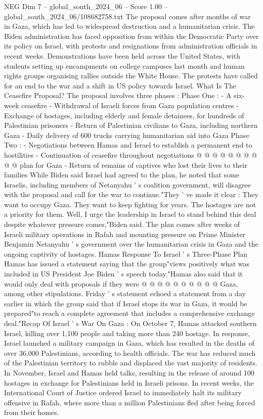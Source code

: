 \begin{textsample}{NEG Dim 7 – global\_south\_2024\_06 – Score 1.00 – global\_south\_2024\_06/108682758.txt}  \label{ex:f7_neg_217}
The proposal comes after months of war in Gaza, which has led to widespread destruction and a humanitarian crisis.
The Biden administration has faced opposition from within the Democratic Party over its policy on Israel, with protests and resignations from administration officials in recent weeks.
Demonstrations have been held across the United States, with students setting up encampments on college campuses last month and human rights groups organising rallies outside the White House.
The protests have called for an end to the war and a shift in US policy towards Israel.
What Is The Ceasefire Proposal?
The proposal involves three phases : Phase One : - A six-week ceasefire - Withdrawal of Israeli forces from Gaza population centres - Exchange of hostages, including elderly and female detainees, for hundreds of Palestinian prisoners - Return of Palestinian civilians to Gaza, including northern Gaza - Daily delivery of 600 trucks carrying humanitarian aid into Gaza Phase Two : - Negotiations between Hamas and Israel to establish a permanent end to hostilities - Continuation of ceasefire throughout negotiations @ @ @ @ @ @ @ @ @ @ plan for Gaza - Return of remains of captives who lost their lives to their families While Biden said Israel had agreed to the plan, he noted that some Israelis, including members of Netanyahu ' s coalition government, will disagree with the proposal and call for the war to continue."They ' ve made it clear : They want to occupy Gaza.
They want to keep fighting for years.
The hostages are not a priority for them.
Well, I urge the leadership in Israel to stand behind this deal despite whatever pressure comes,"Biden said.
The plan comes after weeks of Israeli military operations in Rafah and mounting pressure on Prime Minister Benjamin Netanyahu ' s government over the humanitarian crisis in Gaza and the ongoing captivity of hostages.
Hamas Response To Israel ' s Three-Phase Plan Hamas has issued a statement saying that the group"views positively what was included in US President Joe Biden ' s speech today."Hamas also said that it would only deal with proposals if they were @ @ @ @ @ @ @ @ @ @ Gaza, among other stipulations.
Friday ' s statement echoed a statement from a day earlier in which the group said that if Israel stops its war in Gaza, it would be prepared"to reach a complete agreement that includes a comprehensive exchange deal."Recap Of Israel ' s War On Gaza : On October 7, Hamas attacked southern Israel, killing over 1,100 people and taking more than 240 hostage.
In response, Israel launched a military campaign in Gaza, which has resulted in the deaths of over 36,000 Palestinians, according to health officials.
The war has reduced much of the Palestinian territory to rubble and displaced the vast majority of residents.
In November, Israel and Hamas held talks, resulting in the release of around 100 hostages in exchange for Palestinians held in Israeli prisons.
In recent weeks, the International Court of Justice ordered Israel to immediately halt its military offensive in Rafah, where more than a million Palestinians fled after being forced from their homes.

\end{textsample}
